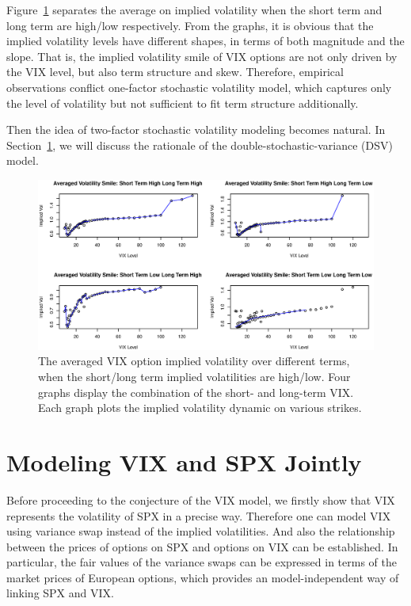 \documentclass[11pt,reqno,final]{amsart}
\begin{document}
Figure~\ref{four_vix} separates the average on implied volatility when the short term and long term are high/low respectively. From the graphs, it is obvious that the implied volatility levels have different shapes, in terms of both magnitude and the slope. That is, the implied volatility smile of VIX options are not only driven by the VIX level, but also term structure and skew. Therefore, empirical observations conflict one-factor stochastic volatility model, which captures only the level of volatility but not sufficient to fit term structure additionally.

Then the idea of two-factor stochastic volatility modeling becomes natural. In Section~\ref{sec::vix_model}, we will discuss the rationale of the double-stochastic-variance (DSV) model.

\begin{figure}
  \centering
  \includegraphics[scale=0.6]{four_vix.eps}
  \caption{The averaged VIX option implied volatility over different terms, when the short/long term implied volatilities are high/low. Four graphs display the combination of the short- and long-term VIX. Each graph plots the implied volatility dynamic on various strikes.}\label{four_vix}
\end{figure}


\bigskip


\section{Modeling VIX and SPX Jointly} \label{sec::vix_model}
Before proceeding to the conjecture of the VIX model, we firstly show that VIX represents the volatility of SPX in a precise way. Therefore one can model VIX using variance swap instead of the implied volatilities. And also the relationship between the prices of options on SPX and options on VIX can be established. In particular, the fair values of the variance swaps can be expressed in terms of the market prices of European options, which provides an model-independent way of linking SPX and VIX.
\end{document}
